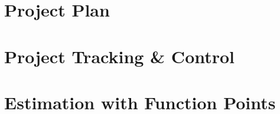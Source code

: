 \documentclass[11pt]{report}
\begin{document}
\chapter{Project Plan}
\label{chapPlan}


\chapter{Project Tracking \& Control}
\label{chapTracking}


\appendix

\chapter{Estimation with Function Points}
\label{chapFunctionPoints}

\end{document}
